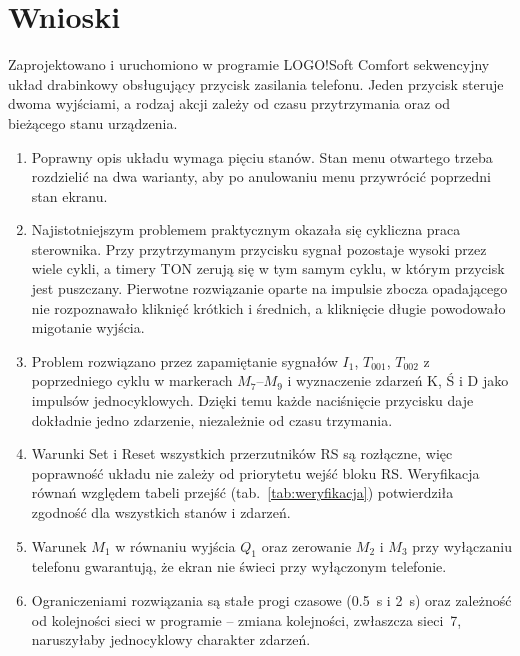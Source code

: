 \section{Wnioski}
\label{sec:wnioski}

Zaprojektowano i uruchomiono w programie LOGO!Soft Comfort
sekwencyjny układ drabinkowy obsługujący przycisk zasilania telefonu.
Jeden przycisk steruje dwoma wyjściami, a rodzaj akcji zależy od czasu
przytrzymania oraz od bieżącego stanu urządzenia.

\begin{enumerate}
    \item Poprawny opis układu wymaga pięciu stanów. Stan menu
          otwartego trzeba rozdzielić na dwa warianty, aby po
          anulowaniu menu przywrócić poprzedni stan ekranu.
    \item Najistotniejszym problemem praktycznym okazała się
          cykliczna praca sterownika. Przy przytrzymanym przycisku
          sygnał pozostaje wysoki przez wiele cykli, a timery TON
          zerują się w tym samym cyklu, w którym przycisk jest
          puszczany. Pierwotne rozwiązanie oparte na impulsie zbocza
          opadającego nie rozpoznawało kliknięć krótkich i średnich,
          a kliknięcie długie powodowało migotanie wyjścia.
    \item Problem rozwiązano przez zapamiętanie sygnałów $I_1$,
          $T_{001}$, $T_{002}$ z poprzedniego cyklu w markerach
          $M_7$--$M_9$ i wyznaczenie zdarzeń K, Ś i D jako impulsów
          jednocyklowych. Dzięki temu każde naciśnięcie przycisku
          daje dokładnie jedno zdarzenie, niezależnie od czasu
          trzymania.
    \item Warunki Set i Reset wszystkich przerzutników RS są
          rozłączne, więc poprawność układu nie zależy od priorytetu
          wejść bloku RS. Weryfikacja równań względem tabeli
          przejść (tab.~\ref{tab:weryfikacja}) potwierdziła zgodność
          dla wszystkich stanów i zdarzeń.
    \item Warunek $M_1$ w równaniu wyjścia $Q_1$ oraz zerowanie
          $M_2$ i $M_3$ przy wyłączaniu telefonu gwarantują, że
          ekran nie świeci przy wyłączonym telefonie.
    \item Ograniczeniami rozwiązania są stałe progi czasowe
          (\SI{0,5}{\second} i \SI{2}{\second}) oraz zależność od
          kolejności sieci w programie -- zmiana kolejności, zwłaszcza
          sieci~7, naruszyłaby jednocyklowy charakter zdarzeń.
\end{enumerate}
